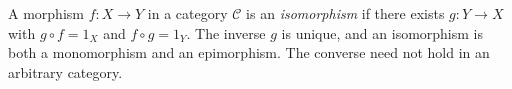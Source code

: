 
A morphism $f:X\to Y$ in a category $\mathcal C$ is an \emph{isomorphism} if there exists $g:Y\to X$ with $g\circ f=1_X$ and $f\circ g=1_Y$. The inverse $g$ is unique, and an isomorphism is both a monomorphism and an epimorphism. The converse need not hold in an arbitrary category.
